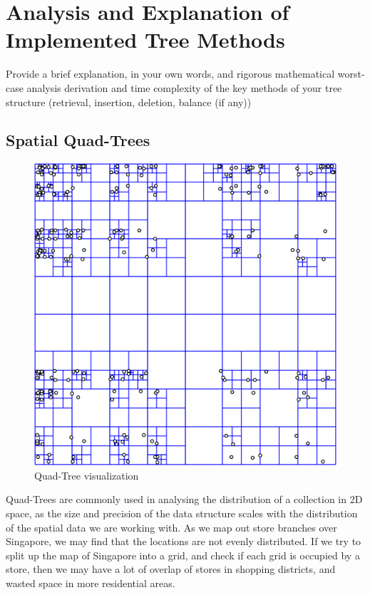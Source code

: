 \documentclass[12pt]{article}
\begin{document}
{\section{Analysis and Explanation of Implemented Tree Methods}

Provide a brief explanation, in your own words, and rigorous mathematical worst-case
analysis derivation and time complexity of the key methods of your tree structure
(retrieval, insertion, deletion, balance (if any))



\subsection{Spatial Quad-Trees}
\begin{figure}
    \centering
    \includegraphics[scale=0.3]{../img/quadtree.png}
    \caption{Quad-Tree visualization}
    \label{fig:my_label}
\end{figure}
Quad-Trees are commonly used in analysing the distribution of a collection in 2D space, as the size and precision of the data structure scales with the distribution of the spatial data we are working with. As we map out store branches over Singapore, we may find that the locations are not evenly distributed. If we try to split up the map of Singapore into a grid, and check if each grid is occupied by a store, then we may have a lot of overlap of stores in shopping districts, and wasted space in more residential areas. 

}
\end{document}
